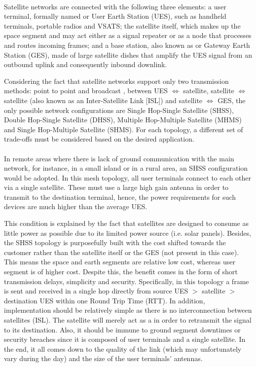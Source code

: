 \paragraph{}
Satellite networks are connected with the following three elements: a user terminal, formally named  or User Earth Station (UES), such as handheld terminals, portable radios and VSATS; the satellite itself, which makes up the space segment and may act either as a signal repeater or as a node\autocite{book1_pp86} that processes and routes incoming frames; and a base station, also known as  or Gateway Earth Station (GES), made of large satellite dishes that amplify the UES signal from an outbound uplink and consequently inbound downlink.

Considering the fact that satellite networks support only two transmission methods: point to point and broadcast\autocite{book1_pp28} , between UES $\iff$ satellite, satellite $\iff$ satellite (also known as an Inter-Satellite Link [ISL]) and satellite $\iff$ GES, the only possible network configurations are Single Hop-Single Satellite (SHSS), Double Hop-Single Satellite (DHSS), Multiple Hop-Multiple Satellite (MHMS) and Single Hop-Multiple Satellite (SHMS). For each topology, a different set of trade-offs must be considered based on the desired application.

\paragraph{}
In remote areas where there is lack of ground communication with the main network, for instance, in a small island or in a rural area, an SHSS configuration would be adopted. In this mesh topology, all user terminals connect to each other via a single satellite. These must use a large high gain antenna in order to transmit to the destination terminal, hence, the power requirements for such devices are much higher than the average UES.

This condition is explained by the fact that satellites are designed to consume as little power as possible due to its limited power source (i.e. solar panels). Besides, the SHSS topology is purposefully built with the cost shifted towards the customer rather than the satellite itself or the GES (not present in this case). This means the space and earth segments are relative low cost, whereas user segment is of higher cost.
Despite this, the benefit comes in the form of short transmission delays, simplicity and security. Specifically, in this topology a frame is sent and received in a single hop directly from source UES $>$ satellite $>$ destination UES within one Round Trip Time (RTT). In addition, implementation should be relatively simple as there is no interconnection between satellites (ISL). The satellite will merely act as a  in order to retransmit the signal to its destination. Also, it should be immune to ground segment downtimes or security breaches since it is composed of user terminals and a single satellite. In the end, it all comes down to the quality of the link (which may unfortunately vary during the day) and the size of the user terminals' antennas.\\

